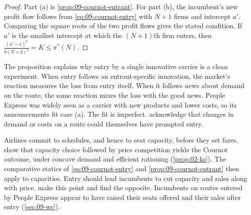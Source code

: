 \begin{proof}
Part (a) is \cref{prop:09-cournot-entrant}. For part (b), the incumbent's new profit flow follows from
\eqref{eq:09-cournot-entry} with $N+1$ firms and intercept $a'$. Comparing the square roots of the two profit
flows gives the stated condition. If $a'$ is the smallest intercept at which the $(N+1)$th firm enters, then
$\frac{(a'-c)^2}{b(N+2)^2} = K \le \pi^*(N)$.
\end{proof}

The proposition explains why entry by a single innovative carrier is a clean experiment. When entry follows
an entrant-specific innovation, the market's reaction measures the loss from entry itself. When it follows
news about demand on the route, the same reaction mixes the loss with the good news. People Express was widely
seen as a carrier with new products and lower costs, so its announcements fit case (a). The fit is imperfect.
\citet[p.~459]{WhinstonCollins1992} acknowledge that changes in demand or costs on a route could themselves have
prompted entry.

\begin{remark}\label{rem:09-ks}
Airlines commit to schedules, and hence to seat capacity, before they set fares. \citet{KrepsScheinkman1983}
show that capacity choice followed by price competition yields the Cournot outcome, under concave demand and
efficient rationing (\cref{prop:02-ks}). The comparative statics of \eqref{eq:09-cournot-entry} and
\cref{prop:09-cournot-entrant} then apply to capacities. Entry should lead incumbents to cut capacity and sales
along with price. \citet[p.~460]{WhinstonCollins1992} make this point and find the opposite. Incumbents on routes
entered by People Express appear to have raised their seats offered and their sales after entry
(\cref{sec:09-wc}).
\end{remark}

